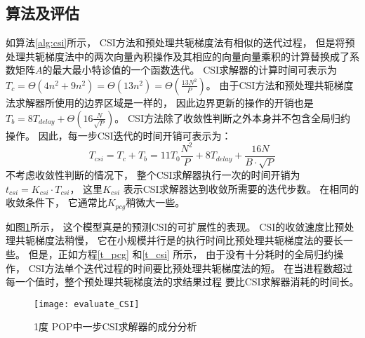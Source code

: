 \subsection{算法及评估}

如算法\ref{alg:csi}所示， CSI方法和预处理共轭梯度法有相似的迭代过程，
但是将预处理共轭梯度法中的两次向量內积操作及其相应的向量向量乘积的计算替换成了系数矩阵$A$的最大最小特诊值的一个函数迭代。 
CSI求解器的计算时间可表示为
$T_c = \Theta (4 n^2 + 9n^2) = \Theta (13n^2) =\Theta(\frac{13N^2}{P})$。 
由于CSI方法和预处理共轭梯度法求解器所使用的边界区域是一样的， 因此边界更新的操作的开销也是 $T_b =8T_{delay} +\Theta (16 \frac{N}{\sqrt{P}})$。 CSI方法除了收敛性判断之外本身并不包含全局归约操作。 
因此，每一步CSI迭代的时间开销可表示为： 　
\begin{equation}
\label{t_csi}
T_{csi} = T_c + T_b
= 11T_0 \frac{N^2}{P}+ 8T_{delay} + \frac{16N}{B \cdot\sqrt{P}}
\end{equation}
不考虑收敛性判断的情况下， 整个CSI求解器执行一次的时间开销为$t_{csi} = K_{csi}\cdot T_{csi}$， 这里$K_{csi}$ 表示CSI求解器达到收敛所需要的迭代步数。 在相同的收敛条件下， 它通常比$K_{pcg}$稍微大一些。 

如图\ref{fig:cst_ratio}所示， 这个模型真是的预测CSI的可扩展性的表现。 
CSI的收敛速度比预处理共轭梯度法稍慢， 它在小规模并行是的执行时间比预处理共轭梯度法的要长一些。 
但是，正如方程\ref{t_pcg} 和\ref{t_csi} 所示， 由于没有十分耗时的全局归约操作， CSI方法单个迭代过程的时间要比预处理共轭梯度法的短。 
在当进程数超过每一个值时，整个预处理共轭梯度法的求结果过程 要比CSI求解器消耗的时间长。 

 
\begin {figure}%
\centering
\texttt{[image: evaluate\_CSI]}
\caption[] { 1度 POP中一步CSI求解器的成分分析}
\label{fig:cst_ratio}
\end{figure}

